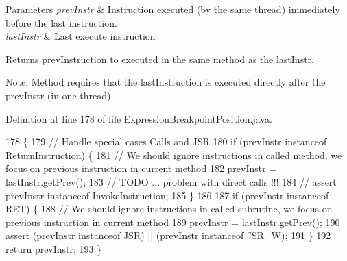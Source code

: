 \begin{DoxyParams}{Parameters}
{\em prev\+Instr} & Instruction executed (by the same thread) immediately before the last instruction. \\
\hline
{\em last\+Instr} & Last execute instruction \\
\hline
\end{DoxyParams}
\begin{DoxyReturn}{Returns}
prev\+Instruction to executed in the same method as the last\+Instr. \begin{DoxyVerb}    Note: Method requires that the lastInstruction is executed directly after the prevInstr (in one thread)\end{DoxyVerb}
 
\end{DoxyReturn}


Definition at line 178 of file Expression\+Breakpoint\+Position.\+java.


\begin{DoxyCode}
178                                                                                                           \{
179     \textcolor{comment}{// Handle special cases Calls and JSR}
180     \textcolor{keywordflow}{if} (prevInstr instanceof ReturnInstruction) \{
181       \textcolor{comment}{// We should ignore instructions in called method, we focus on previous instruction in current method}
182       prevInstr = lastInstr.getPrev();
183       \textcolor{comment}{// TODO ... problem with direct calls !!!}
184       \textcolor{comment}{// assert prevInstr instanceof InvokeInstruction;}
185     \}
186 
187     \textcolor{keywordflow}{if} (prevInstr instanceof RET) \{
188       \textcolor{comment}{// We should ignore instructions in called subrutine, we focus on previous instruction in current
       method}
189       prevInstr = lastInstr.getPrev();
190       assert (prevInstr instanceof JSR) || (prevInstr instanceof JSR\_W);
191     \}
192     \textcolor{keywordflow}{return} prevInstr;
193   \}
\end{DoxyCode}
